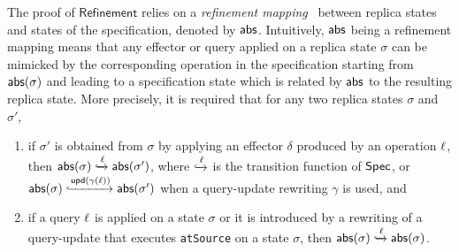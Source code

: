 The proof of $\mathsf{Refinement}$ relies on a \emph{refinement
  mapping}~\cite{AbadiL91,DBLP:journals/iandc/LynchV95} between replica states and states of the
specification, denoted by $\mathsf{abs}$. Intuitively, $\mathsf{abs}$ being a refinement mapping means that any
effector or query applied on a replica state $\sigma$ can be mimicked by the corresponding operation in the specification
starting from $\mathsf{abs}(\sigma)$ and leading to a specification state which is related by $\mathsf{abs}$ to the resulting
replica state.
More precisely, it is required that for 
any two replica states $\sigma$ and $\sigma'$,
\begin{enumerate}
        \item if $\sigma'$ is obtained from $\sigma$ by applying an
          effector $\delta$ produced by an operation $\ell$, then
          \mbox{$\mathsf{abs}(\sigma)\xhookrightarrow{\ensuremath{\ell}}\mathsf{abs}(\sigma')$},
          where $\xhookrightarrow{\ensuremath{\ell}}$ is the transition function of
          $\mathsf{Spec}$, or \mbox{$\mathsf{abs}(\sigma)\xhookrightarrow{\ensuremath{\mathsf{upd}}(\gamma(\ensuremath{\ell}))}\mathsf{abs}(\sigma')$} 
          when a query-update rewriting $\gamma$ is used,
          and
        \item if a query $\ell$ is applied on a state $\sigma$ or
          it is introduced by a rewriting of a query-update that
          executes \lstinline|atSource| on a state $\sigma$, then
          $\mathsf{abs}(\sigma)\xhookrightarrow{\ensuremath{\ell}}\mathsf{abs}(\sigma)$.
\end{enumerate}


